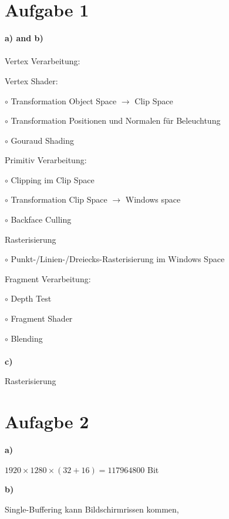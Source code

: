 \documentclass[fleqn]{article}
\begin{document}


\pagestyle{main}

\newpage

\section{Aufgabe 1}

\noindent\textbf{a) and b)}
\\
\\
\noindent Vertex Verarbeitung:

Vertex Shader:

$\circ$ Transformation Object Space $\rightarrow$ Clip Space

$\circ$ Transformation Positionen und Normalen für Beleuchtung

$\circ$ Gouraud Shading

\noindent Primitiv Verarbeitung:

$\circ$ Clipping im Clip Space

$\circ$ Transformation Clip Space $\rightarrow$ Windows space

$\circ$ Backface Culling

\noindent Rasterisierung

$\circ$ Punkt-/Linien-/Dreiecks-Rasterisierung im Windows Space

\noindent Fragment Verarbeitung:

$\circ$ Depth Test

$\circ$ Fragment Shader

$\circ$ Blending
\\
\\
\noindent\textbf{c)}

Rasterisierung

\section{Aufagbe 2}

\noindent\textbf{a)}

$1920\times 1280\times (32+16) = 117964800$ Bit

\noindent\textbf{b)}

Single-Buffering kann Bildschirmrissen kommen, 
\end{document}
